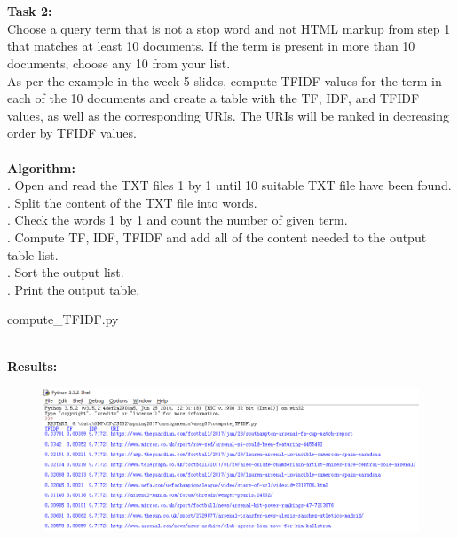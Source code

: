 \documentclass{article}
\begin{document}
		\textbf{\\\\Task 2:}\\
		\indent Choose a query term that is not a stop word and not HTML markup from step 1 that matches at least 10 documents. If the term is present in more than 10 documents, choose any 10 from your list.\\
		\indent As per the example in the week 5 slides, compute TFIDF values for the term in each of the 10 documents and create a table with the TF, IDF, and TFIDF values, as well as the corresponding URIs. The URIs will be ranked in decreasing order by TFIDF values.\\\\
		\textbf{Algorithm:}\\
		. Open and read the TXT files 1 by 1 until 10 suitable TXT file have been found.\\
		. Split the content of the TXT file into words.\\
		. Check the words 1 by 1 and count the number of given term.\\
		. Compute TF, IDF, TFIDF and add all of the content needed to the output table list.\\
		. Sort the output list.\\
		. Print the output table.
		\begin{list}{\textbf{Source code:}}
			\item compute\_TFIDF.py
		\end{list}
		\noindent
		\\\textbf{Results:}
		\begin{figure}[h]
			\centering 
			\includegraphics[width=1\textwidth]{TFIDF.png}
			\label{fig:TFIDF} 
		\end{figure}
\end{document}
